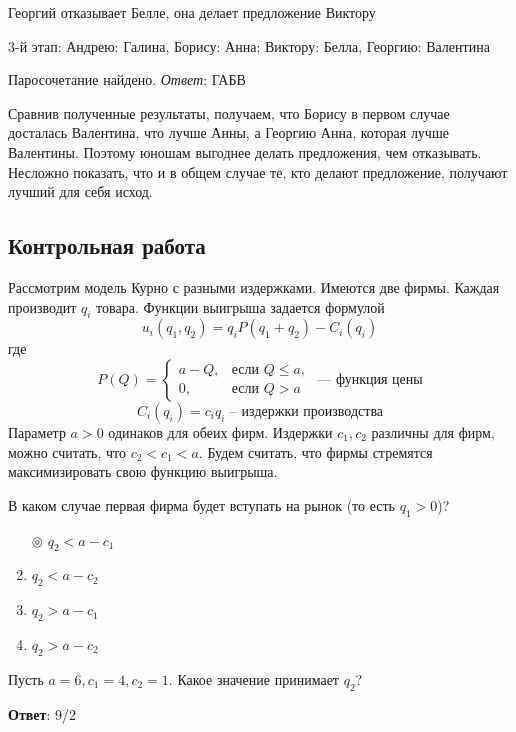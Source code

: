 	Георгий отказывает Белле, она делает предложение Виктору
	
	3-й этап: Андрею: Галина, Борису: Анна; Виктору: Белла, Георгию: Валентина
	
	Паросочетание найдено. \textit{Ответ}: ГАБВ
	
	Сравнив полученные результаты, получаем, что Борису в первом случае досталась Валентина, что лучше Анны, а Георгию Анна, которая лучше Валентины. Поэтому юношам выгоднее делать предложения, чем отказывать. Несложно показать, что и в общем случае те, кто делают предложение, получают лучший для себя исход.
	
	
	
	
	
	
	
\subsection{Контрольная работа}

\task
Рассмотрим модель Курно с разными издержками. Имеются две фирмы. Каждая производит $q_i$ товара. Функции выигрыша задается формулой
\[
	u_i (q_1, q_2) = q_i P(q_1 + q_2) - C_i (q_i)
\]
где
\[
P(Q) =
	\begin{cases}
	a - Q, & \text{если } Q \leq a, \\
	0, & \text{если } Q > a
	\end{cases} \text{ --- функция цены}
\]
\[
	C_i (q_i) = c_i q_i \text{ -- издержки производства}
\]
Параметр $a > 0$ одинаков для обеих фирм. Издержки $c_1, c_2$ различны для фирм, можно считать, что $c_2 < c_1 < a$. Будем считать, что фирмы стремятся максимизировать свою функцию выигрыша.

В каком случае первая фирма будет вступать на рынок (то есть $q_1 > 0$)?

\begin{enumerate}[label=$\circ$]
	\item[$\circledcirc$] $q_2 < a - c_1$
	\item $q_2 < a - c_2$
	\item $q_2 > a - c_1$
	\item $q_2 > a - c_2$
\end{enumerate}

\solution %

\task
Пусть $a = 6, c_1 = 4, c_2 = 1$. Какое значение принимает $q_2$?

\textbf{Ответ}: 
9/2

\solution %

